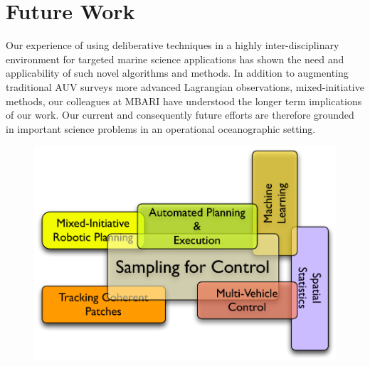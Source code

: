 \section{Future Work}
\label{sec:future}




Our experience of using deliberative techniques in a highly
inter-disciplinary environment for targeted marine science
applications has shown the need and applicability of such novel
algorithms and methods. In addition to augmenting traditional AUV
surveys more advanced Lagrangian observations, mixed-initiative
methods, our colleagues at MBARI have understood the longer term
implications of our work. Our current and consequently future efforts
are therefore grounded in important science problems in an operational
oceanographic setting. 

\begin{figure}[h]
  \centering
  \includegraphics[scale=0.45]{figs/autonomy-topics.pdf}
  \caption{\small }
  \label{fig:topics}
\end{figure}


